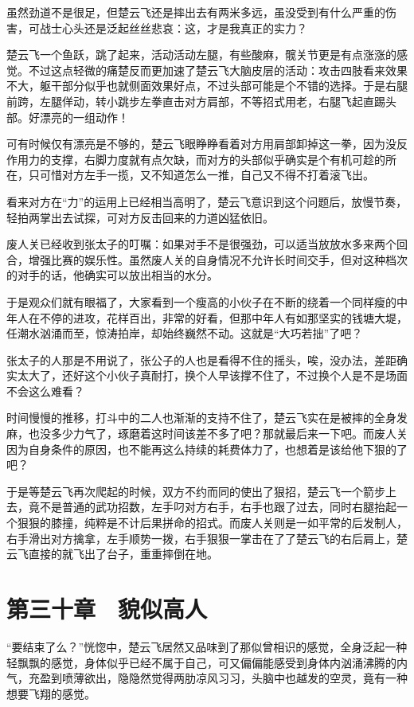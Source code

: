 虽然劲道不是很足，但楚云飞还是摔出去有两米多远，虽没受到有什么严重的伤害，可战士心头还是泛起丝丝悲哀：这，才是我真正的实力？

楚云飞一个鱼跃，跳了起来，活动活动左腿，有些酸麻，髋关节更是有点涨涨的感觉。不过这点轻微的痛楚反而更加速了楚云飞大脑皮层的活动：攻击四肢看来效果不大，躯干部分似乎也就侧面效果好点，不过头部可能是个不错的选择。于是右腿前跨，左腿佯动，转小跳步左拳直击对方肩部，不等招式用老，右腿飞起直踢头部。好漂亮的一组动作！

可有时候仅有漂亮是不够的，楚云飞眼睁睁看着对方用肩部卸掉这一拳，因为没反作用力的支撑，右脚力度就有点欠缺，而对方的头部似乎确实是个有机可趁的所在，只可惜对方左手一揽，又不知道怎么一推，自己又不得不打着滚飞出。

看来对方在“力”的运用上已经相当高明了，楚云飞意识到这个问题后，放慢节奏，轻拍两掌出去试探，可对方反击回来的力道凶猛依旧。

废人关已经收到张太子的叮嘱：如果对手不是很强劲，可以适当放放水多来两个回合，增强比赛的娱乐性。虽然废人关的自身情况不允许长时间交手，但对这种档次的对手的话，他确实可以放出相当的水分。

于是观众们就有眼福了，大家看到一个瘦高的小伙子在不断的绕着一个同样瘦的中年人在不停的进攻，花样百出，非常的好看，但那中年人有如那坚实的钱塘大堤，任潮水汹涌而至，惊涛拍岸，却始终巍然不动。这就是“大巧若拙”了吧？

张太子的人那是不用说了，张公子的人也是看得不住的摇头，唉，没办法，差距确实太大了，还好这个小伙子真耐打，换个人早该撑不住了，不过换个人是不是场面不会这么难看？

时间慢慢的推移，打斗中的二人也渐渐的支持不住了，楚云飞实在是被摔的全身发麻，也没多少力气了，琢磨着这时间该差不多了吧？那就最后来一下吧。而废人关因为自身条件的原因，也不能再这么持续的耗费体力了，也想着是该给他下狠的了吧？

于是等楚云飞再次爬起的时候，双方不约而同的使出了狠招，楚云飞一个箭步上去，竟不是普通的武功招数，左手叼对方右手，右手也跟了过去，同时右腿抬起一个狠狠的膝撞，纯粹是不计后果拼命的招式。而废人关则是一如平常的后发制人，右手滑出对方擒拿，左手顺势一拨，右手狠狠一掌击在了了楚云飞的右后肩上，楚云飞直接的就飞出了台子，重重摔倒在地。

\section{第三十章　貌似高人}

“要结束了么？”恍惚中，楚云飞居然又品味到了那似曾相识的感觉，全身泛起一种轻飘飘的感觉，身体似乎已经不属于自己，可又偏偏能感受到身体内汹涌沸腾的内气，充盈到喷薄欲出，隐隐然觉得两肋凉风习习，头脑中也越发的空灵，竟有一种想要飞翔的感觉。

